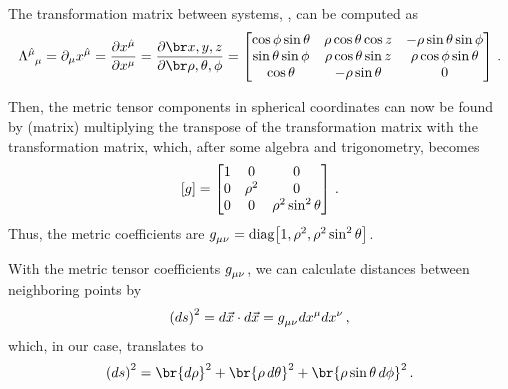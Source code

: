 The transformation matrix between systems, , can be computed as
%
\begin{equation*}
  \ttransmat{\ridx\mu}\mu = \ipd\mu\tvec\pos{\ridx\mu}
                          = \dfrac{\partial\tvec\pos{\ridx\mu}}{\partial\tvec\pos\mu}
                          = \xttransmat{\xpos,\ypos,\zpos}{\sxpos,\sypos,\szpos}
                          = \begin{bmatrix}
                              \cos\szpos\sin\sypos & \sxpos\cos\sypos\cos\zpos & -\sxpos\sin\sypos\sin\szpos \\
                              \sin\sypos\sin\szpos & \sxpos\cos\sypos\sin\zpos & \sxpos\cos\szpos\sin\sypos  \\
                              \cos\sypos           & -\sxpos\sin\sypos         & 0                           \\
                            \end{bmatrix}\,.
\end{equation*}

Then, the metric tensor components in spherical coordinates can now be found by (matrix) multiplying the transpose of the transformation matrix with the transformation matrix, which, after some algebra and trigonometry, becomes
%
\begin{equation*}
  \asmatrix\metric =  \begin{bmatrix}
                        1 & 0         & 0 \\
                        0 & \sxpos^2  & 0 \\
                        0 & 0         & \sxpos^2\sin^2\sypos \\
                      \end{bmatrix} \,.
\end{equation*}
%
Thus, the metric coefficients are $\tmetric\mu\nu = \diag\asmatrix{1,\sxpos^2,\sxpos^2\sin^2\sypos}$.

With the metric tensor coefficients $\tmetric\mu\nu$, we can calculate distances between neighboring points by
%
\begin{equation*}
  \sqdifdist  = d\vec\pos\iprod d\vec\pos
              = \tmetric\mu\nu d\tvec\pos\mu d\tvec\pos\nu\,,
\end{equation*}
%
which, in our case, translates to
%
\begin{equation*}
  \sqdifdist = \br{d\sxpos}^2 + \br{\sxpos\,d\sypos}^2 + \br{\sxpos\sin\sypos\,d\szpos}^2 \,.
\end{equation*}


